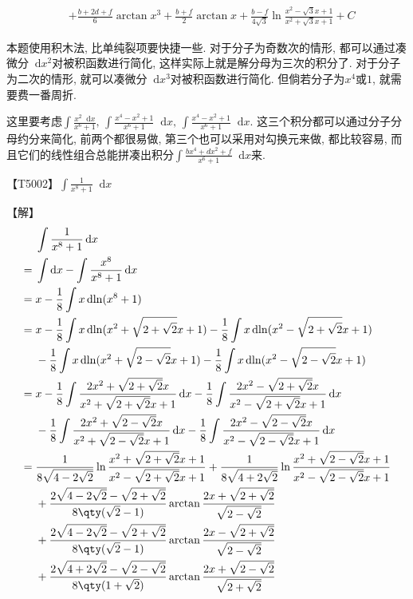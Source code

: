 \documentclass{ctexbook}
\newcommand*{\dif}{\mathop{}\!\mathrm{d}}
\begin{document}
{\begin{align*}
{}&+\frac{b+2d+f}{6}\arctan{x^{3}}+\frac{b+f}{2}\arctan{x}+\frac{b-f}{4\sqrt{3}}\ln{\frac{x^{2}-\sqrt{3}x+1}{x^{2}+\sqrt{3}x+1}}+C
\end{align*}\par
{\kaishu 本题使用积木法, 比单纯裂项要快捷一些. 对于分子为奇数次的情形, 都可以通过凑微分$\dif{x^{2}}$对被积函数进行简化, 这样实际上就是解分母为三次的积分了. 对于分子为二次的情形, 就可以凑微分$\dif{x^{3}}$对被积函数进行简化. 但倘若分子为$x^{4}$或$1$, 就需要费一番周折. \par
这里要考虑$\int\frac{x^{2}\dif{x}}{x^{6}+1},\,\int\frac{x^{4}-x^{2}+1}{x^{6}+1}\dif{x},\,\int\frac{x^{4}-x^{2}+1}{x^{6}+1}\dif{x}$. 这三个积分都可以通过分子分母约分来简化, 前两个都很易做, 第三个也可以采用对勾换元来做, 都比较容易, 而且它们的线性组合总能拼凑出积分$\int\frac{bx^{4}+dx^{2}+f}{x^{6}+1}\dif{x}$来. \par}
【T5002】$\int\frac{1}{x^{8}+1}\dif{x}$\par
【解】
\begin{align*}
{}&\int\frac{1}{x^{8}+1}\dif{x}\\
={}&\int\dif{x}-\int\frac{x^{8}}{x^{8}+1}\dif{x}\\
={}&x-\frac{1}{8}\int x\dif{\ln(x^{8}+1)}\\
={}&x-\frac{1}{8}\int x\dif{\ln(x^{2}+\sqrt{2+\sqrt{2}}x+1)}-\frac{1}{8}\int x\dif{\ln(x^{2}-\sqrt{2+\sqrt{2}}x+1)}\\
{}&-\frac{1}{8}\int x\dif{\ln(x^{2}+\sqrt{2-\sqrt{2}}x+1)}-\frac{1}{8}\int x\dif{\ln(x^{2}-\sqrt{2-\sqrt{2}}x+1)}\\
={}&x-\frac{1}{8}\int\frac{2x^{2}+\sqrt{2+\sqrt{2}}x}{x^{2}+\sqrt{2+\sqrt{2}}x+1}\dif{x}-\frac{1}{8}\int\frac{2x^{2}-\sqrt{2+\sqrt{2}}x}{x^{2}-\sqrt{2+\sqrt{2}}x+1}\dif{x}\\
{}&-\frac{1}{8}\int\frac{2x^{2}+\sqrt{2-\sqrt{2}}x}{x^{2}+\sqrt{2-\sqrt{2}}x+1}\dif{x}-\frac{1}{8}\int\frac{2x^{2}-\sqrt{2-\sqrt{2}}x}{x^{2}-\sqrt{2-\sqrt{2}}x+1}\dif{x}\\
={}&\frac{1}{8\sqrt{4-2\sqrt{2}}}\ln{\frac{x^{2}+\sqrt{2+\sqrt{2}}x+1}{x^{2}-\sqrt{2+\sqrt{2}}x+1}}+\frac{1}{8\sqrt{4+2\sqrt{2}}}\ln{\frac{x^{2}+\sqrt{2-\sqrt{2}}x+1}{x^{2}-\sqrt{2-\sqrt{2}}x+1}}\\
{}&+\frac{2\sqrt{4-2\sqrt{2}}-\sqrt{2+\sqrt{2}}}{8\qty(\sqrt{2}-1)}\arctan{\frac{2x+\sqrt{2+\sqrt{2}}}{\sqrt{2-\sqrt{2}}}}\\
{}&+\frac{2\sqrt{4-2\sqrt{2}}-\sqrt{2+\sqrt{2}}}{8\qty(\sqrt{2}-1)}\arctan{\frac{2x-\sqrt{2+\sqrt{2}}}{\sqrt{2-\sqrt{2}}}}\\
{}&+\frac{2\sqrt{4+2\sqrt{2}}-\sqrt{2-\sqrt{2}}}{8\qty(1+\sqrt{2})}\arctan{\frac{2x+\sqrt{2-\sqrt{2}}}{\sqrt{2+\sqrt{2}}}}\\

\end{align*}}
\end{document}

